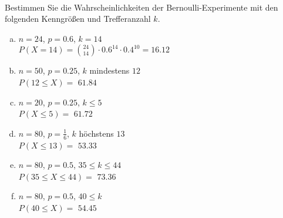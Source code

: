 \begin{aufgabe} ~ \\ 
Bestimmen Sie die Wahrscheinlichkeiten der Bernoulli-Experimente mit den folgenden Kenngrößen und Trefferanzahl $k$.\begin{multicols}{2} 
\begin{enumerate}[a)] 
\item 
$n=24$, $p=0.6$, $k=14$\\ 
$P(X=14)=\binom{24}{14}\cdot0.6^{14}\cdot0.4^{10}=16.12$
\item 
$n=50$, $p=0.25$, $k$ mindestens $12$\\ 
$P(12\leq X)=$ $61.84$
\item 
$n=20$, $p=0.25$, $k \leq 5$\\ 
$P(X \leq 5)=$ $61.72$
\item 
$n=80$, $p=\frac{1}{6}$, $k$ höchstens $13$\\ 
$P(X \leq 13)=$ $53.33$
\item 
$n=80$, $p=0.5$, $35\leq k \leq 44$\\ 
$P(35\leq X \leq 44)=$ $73.36$
\item 
$n=80$, $p=0.5$, $40\leq k $\\ 
$P(40\leq X)=$ $54.45$
\end{enumerate} 
\end{multicols} 
\end{aufgabe} 

